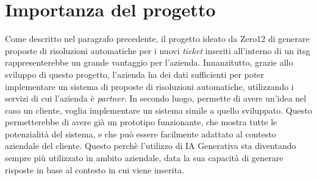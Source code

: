 \section{Importanza del progetto}
Come descritto nel paragrafo precedente, il progetto ideato da Zero12 di generare proposte di risoluzioni automatiche per i nuovi \textit{ticket} inseriti all'interno di un \gls{itsg} rappresenterebbe un grande vantaggio per l'azienda. Innanzitutto, 
grazie allo sviluppo di questo progetto, l'azienda ha dei dati sufficienti per poter implementare un sistema di proposte di risoluzioni automatiche, utilizzando i servizi di cui l'azienda è \textit{partner}. In secondo luogo, permette di avere un'idea nel 
caso un cliente, voglia implementare un sistema simile a quello sviluppato. Questo permetterebbe di avere già un prototipo funzionante, che mostra tutte le potenzialità del sistema, e che può essere facilmente adattato al contesto aziendale del cliente.
Questo perchè l'utilizzo di IA Generativa sta diventando sempre più utilizzato in ambito aziendale, data la sua capacità di generare risposte in base al contesto in cui viene inserita.

